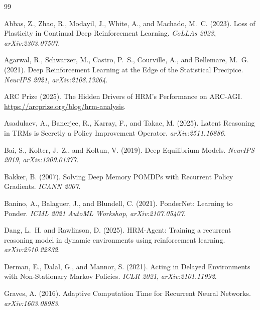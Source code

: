 \documentclass[11pt]{article}
\begin{document}

\begin{thebibliography}{99}

Abbas, Z., Zhao, R., Modayil, J., White, A., and Machado, M.~C. (2023).
\newblock Loss of Plasticity in Continual Deep Reinforcement Learning.
\newblock \emph{CoLLAs 2023}, \emph{arXiv:2303.07507}.

Agarwal, R., Schwarzer, M., Castro, P.~S., Courville, A., and Bellemare, M.~G. (2021).
\newblock Deep Reinforcement Learning at the Edge of the Statistical Precipice.
\newblock \emph{NeurIPS 2021}, \emph{arXiv:2108.13264}.

ARC Prize (2025).
\newblock The Hidden Drivers of HRM's Performance on ARC-AGI.
\newblock \url{https://arcprize.org/blog/hrm-analysis}.

Asadulaev, A., Banerjee, R., Karray, F., and Takac, M. (2025).
\newblock Latent Reasoning in TRMs is Secretly a Policy Improvement Operator.
\newblock \emph{arXiv:2511.16886}.

Bai, S., Kolter, J.~Z., and Koltun, V. (2019).
\newblock Deep Equilibrium Models.
\newblock \emph{NeurIPS 2019}, \emph{arXiv:1909.01377}.

Bakker, B. (2007).
\newblock Solving Deep Memory POMDPs with Recurrent Policy Gradients.
\newblock \emph{ICANN 2007}.

Banino, A., Balaguer, J., and Blundell, C. (2021).
\newblock PonderNet: Learning to Ponder.
\newblock \emph{ICML 2021 AutoML Workshop}, \emph{arXiv:2107.05407}.

Dang, L.~H. and Rawlinson, D. (2025).
\newblock HRM-Agent: Training a recurrent reasoning model in dynamic environments using reinforcement learning.
\newblock \emph{arXiv:2510.22832}.

Derman, E., Dalal, G., and Mannor, S. (2021).
\newblock Acting in Delayed Environments with Non-Stationary Markov Policies.
\newblock \emph{ICLR 2021}, \emph{arXiv:2101.11992}.

Graves, A. (2016).
\newblock Adaptive Computation Time for Recurrent Neural Networks.
\newblock \emph{arXiv:1603.08983}.


\end{thebibliography}
\end{document}
